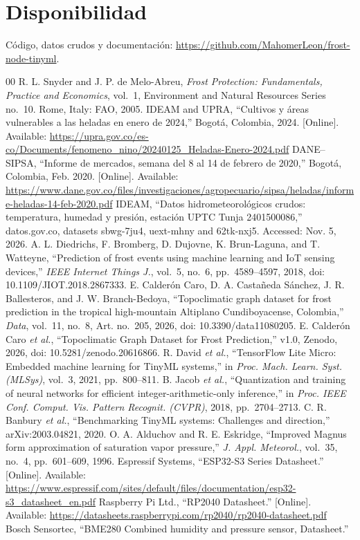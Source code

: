 \documentclass[conference]{IEEEtran}
\begin{document}
\section*{Disponibilidad}
C\'odigo, datos crudos y documentaci\'on: \url{https://github.com/MahomerLeon/frost-node-tinyml}.

\begin{thebibliography}{00}
 R. L. Snyder and J. P. de Melo-Abreu, \textit{Frost Protection: Fundamentals, Practice and Economics}, vol.~1, Environment and Natural Resources Series no.~10. Rome, Italy: FAO, 2005.
 IDEAM and UPRA, ``Cultivos y \'areas vulnerables a las heladas en enero de 2024,'' Bogot\'a, Colombia, 2024. [Online]. Available: \url{https://upra.gov.co/es-co/Documents/fenomeno_nino/20240125_Heladas-Enero-2024.pdf}
 DANE--SIPSA, ``Informe de mercados, semana del 8 al 14 de febrero de 2020,'' Bogot\'a, Colombia, Feb. 2020. [Online]. Available: \url{https://www.dane.gov.co/files/investigaciones/agropecuario/sipsa/heladas/informe-heladas-14-feb-2020.pdf}
 IDEAM, ``Datos hidrometeorol\'ogicos crudos: temperatura, humedad y presi\'on, estaci\'on UPTC Tunja 2401500086,'' datos.gov.co, datasets sbwg-7ju4, uext-mhny and 62tk-nxj5. Accessed: Nov. 5, 2026.
 A. L. Diedrichs, F. Bromberg, D. Dujovne, K. Brun-Laguna, and T. Watteyne, ``Prediction of frost events using machine learning and IoT sensing devices,'' \textit{IEEE Internet Things J.}, vol.~5, no.~6, pp.~4589--4597, 2018, doi: 10.1109/JIOT.2018.2867333.
 E. Calder\'on Caro, D. A. Casta\~neda S\'anchez, J. R. Ballesteros, and J. W. Branch-Bedoya, ``Topoclimatic graph dataset for frost prediction in the tropical high-mountain Altiplano Cundiboyacense, Colombia,'' \textit{Data}, vol.~11, no.~8, Art. no.~205, 2026, doi: 10.3390/data11080205.
 E. Calder\'on Caro \textit{et al.}, ``Topoclimatic Graph Dataset for Frost Prediction,'' v1.0, Zenodo, 2026, doi: 10.5281/zenodo.20616866.
 R. David \textit{et al.}, ``TensorFlow Lite Micro: Embedded machine learning for TinyML systems,'' in \textit{Proc. Mach. Learn. Syst. (MLSys)}, vol.~3, 2021, pp.~800--811.
 B. Jacob \textit{et al.}, ``Quantization and training of neural networks for efficient integer-arithmetic-only inference,'' in \textit{Proc. IEEE Conf. Comput. Vis. Pattern Recognit. (CVPR)}, 2018, pp.~2704--2713.
 C. R. Banbury \textit{et al.}, ``Benchmarking TinyML systems: Challenges and direction,'' arXiv:2003.04821, 2020.
 O. A. Alduchov and R. E. Eskridge, ``Improved Magnus form approximation of saturation vapor pressure,'' \textit{J. Appl. Meteorol.}, vol.~35, no.~4, pp.~601--609, 1996.
 Espressif Systems, ``ESP32-S3 Series Datasheet.'' [Online]. Available: \url{https://www.espressif.com/sites/default/files/documentation/esp32-s3_datasheet_en.pdf}
 Raspberry Pi Ltd., ``RP2040 Datasheet.'' [Online]. Available: \url{https://datasheets.raspberrypi.com/rp2040/rp2040-datasheet.pdf}
 Bosch Sensortec, ``BME280 Combined humidity and pressure sensor, Datasheet.''
\end{thebibliography}
\end{document}
